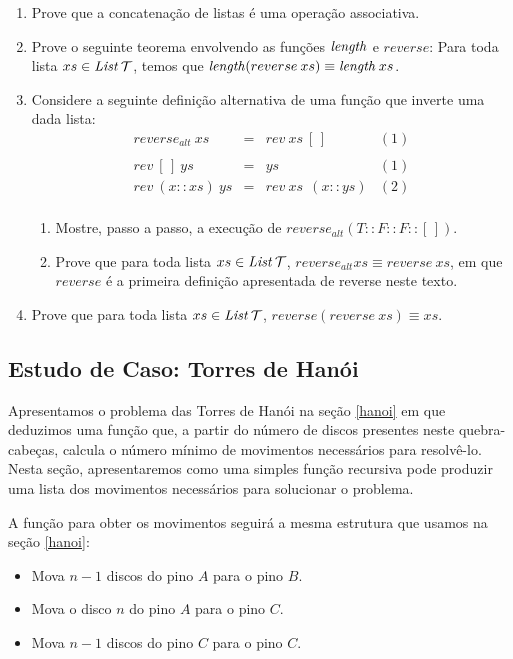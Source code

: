 \begin{enumerate}
  \item Prove que a concatenação de listas é uma operação associativa.
  \item Prove o seguinte teorema envolvendo as funções $\textit{length\/}$ e
    $reverse$: Para toda lista $xs \in \textit{List\/}\,\mathcal{T}$, temos que
    $\textit{length\/}(reverse \:xs)\equiv \textit{length\/}\:xs$.
 \item Considere a seguinte definição alternativa de uma função que
   inverte uma dada lista:
\[
\begin{array}{lclc}
  reverse_{alt}\:xs & = & rev\: xs \: [\,] & (1)\\
   & \\
  rev \: [\,] \: ys & = & ys & (1) \\
  rev \: (x :: xs) \: ys & = & rev \: xs \:\:(x :: ys) & (2)\\
\end{array}
\]
 \begin{enumerate}
   \item Mostre, passo a passo, a execução de $reverse_{alt}(T :: F ::
     F :: [\,])$.
   \item Prove que para toda lista $xs \in \textit{List\/}\,\mathcal{T}$,
     $reverse_{alt}xs \equiv reverse\: xs$, em que $reverse$ é a
     primeira definição apresentada de reverse neste texto.
  \end{enumerate}
  \item Prove que para toda lista $xs\in\textit{List\/}\,\mathcal{T}$,
    $reverse(reverse\:xs) \equiv xs$.
\end{enumerate}


\subsection{Estudo de Caso: Torres de Hanói}

Apresentamos o problema das Torres de Hanói na seção \ref{hanoi} em
que deduzimos uma função que, a partir do número de discos presentes
neste quebra-cabeças, calcula o número mínimo de movimentos
necessários para resolvê-lo. Nesta seção, apresentaremos como uma
simples função recursiva pode produzir uma lista dos movimentos
necessários para solucionar o problema.

A função para obter os movimentos seguirá a mesma estrutura que usamos
na seção \ref{hanoi}:
\begin{itemize}
  \item Mova $n - 1$ discos do pino $A$ para o pino $B$.
  \item Mova o disco $n$ do pino $A$ para o pino $C$.
  \item Mova $n - 1$ discos do pino $C$ para o pino $C$.
\end{itemize}


